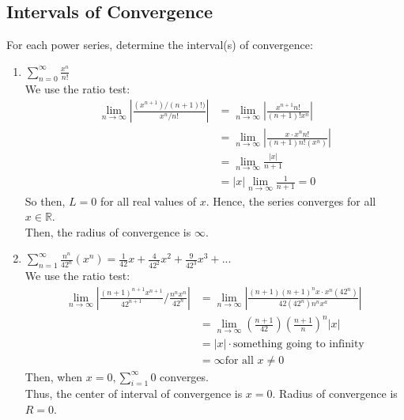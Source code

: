 \documentclass{article}
\begin{document}
\subsection{Intervals of Convergence}
For each power series, determine the interval(s) of convergence:
\begin{enumerate}
    \item $\sum_{n=0}^\infty \frac{x^n}{n!}$\\
    We use the ratio test:
    \begin{align*}
        \lim_{n\to\infty} |\frac{(x^{n+1})/(n+1)!)}{x^n/n!}| & = \lim_{n\to\infty} |\frac{x^{n+1} n!}{(n+1)! x^n}|\\
        & = \lim_{n\to\infty} |\frac{x \cdot x^n n!}{(n+1)n! (x^n)}|\\
        & = \lim_{n\to\infty} \frac{|x|}{n + 1}\\
        & = |x| \lim_{n\to\infty} \frac{1}{n+1} = 0
    \end{align*}
    So then, $L = 0$ for all real values of $x$. Hence, the series converges for all $x \in \mathbb{R}$.\\
    Then, the radius of convergence is $\infty$.
    
    \item $\sum_{n=1}^\infty \frac{n^n}{42^n}(x^n) = \frac{1}{42}x + \frac{4}{42^2} x^2 + \frac{9}{42^3}x^3 + ...$\\
    We use the ratio test:
    \begin{align*}
        \lim_{n\to\infty} |\frac{(n+1)^{n+1}x^{n+1}}{42^{n+1}} / \frac{n^nx^n}{42^n}| & = \lim_{n\to\infty} |\frac{(n+1)(n+1)^n x \cdot x^n (42^n)}{42(42^n)n^n x^a}|\\
        & = \lim_{n\to\infty} (\frac{n+1}{42})(\frac{n+1}{n})^n |x|\\
        & = |x| \cdot \text{something going to infinity}\\
        & = \infty \text{for all }x \neq 0
    \end{align*}
    Then, when $x=0, \sum_{i=1}^\infty 0$ converges.\\
    Thus, the center of interval of convergence is $x=0.$ Radius of convergence is $R=0$.
    

\end{enumerate}
\end{document}

